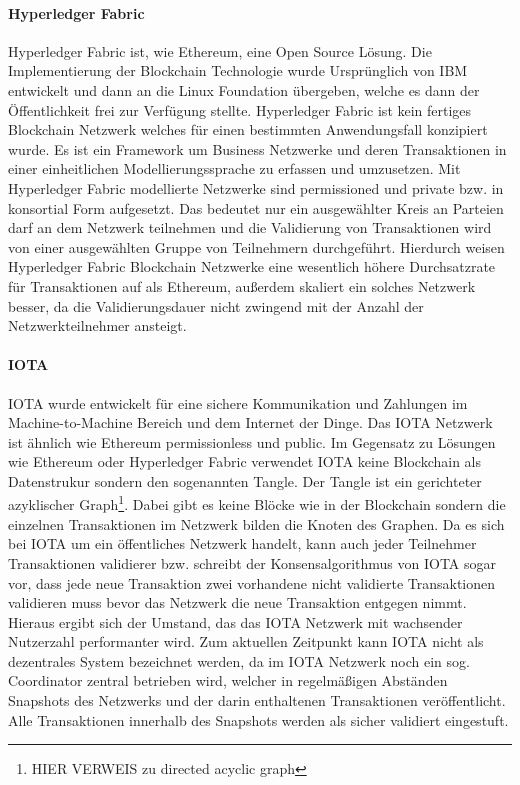 \paragraph{Hyperledger Fabric}
Hyperledger Fabric ist, wie Ethereum, eine Open Source Lö\-sung. Die Implementierung der Blockchain Technologie wurde Ursprünglich von IBM entwickelt und dann an die Linux Foundation übergeben, welche es dann der Öffentlichkeit frei zur Verfügung stellte. Hyperledger Fabric ist kein fertiges Blockchain Netzwerk welches für einen bestimmten Anwendungsfall konzipiert wurde. Es ist ein Framework um Business Netzwerke und deren Transaktionen in einer einheitlichen Modellierungssprache zu erfassen und umzusetzen. Mit Hyperledger Fabric modellierte Netzwerke sind permissioned und private bzw. in konsortial Form aufgesetzt. Das bedeutet nur ein ausgewählter Kreis an Parteien darf an dem Netzwerk teilnehmen und die Validierung von Transaktionen wird von einer ausgewählten Gruppe von Teilnehmern durchgeführt. Hierdurch weisen Hyperledger Fabric Blockchain Netzwerke eine wesentlich höhere Durchsatzrate für Transaktionen auf als Ethereum, außerdem skaliert ein solches Netzwerk besser, da die Validierungsdauer nicht zwingend mit der Anzahl der Netzwerkteilnehmer ansteigt.

\paragraph{IOTA}
IOTA wurde entwickelt für eine sichere Kommunikation und Zahlungen im Machine-to-Machine Bereich und dem Internet der Dinge. Das IOTA Netzwerk ist ähnlich wie Ethereum permissionless und public. Im Gegensatz zu Lösungen wie Ethereum oder Hyperledger Fabric verwendet IOTA keine Blockchain als Datenstrukur sondern den sogenannten \glqq Tangle\grqq{}. Der Tangle ist ein gerichteter azyklischer Graph\footnote{HIER VERWEIS zu directed acyclic graph}. Dabei gibt es keine Blöcke wie in der Blockchain sondern die einzelnen Transaktionen im Netzwerk bilden die Knoten des Graphen. Da es sich bei IOTA um ein öffentliches Netzwerk handelt, kann auch jeder Teilnehmer Transaktionen validierer bzw. schreibt der Konsensalgorithmus von IOTA sogar vor, dass jede neue Transaktion zwei vorhandene nicht validierte Transaktionen validieren muss bevor das Netzwerk die neue Transaktion entgegen nimmt. Hieraus ergibt sich der Umstand, das das IOTA Netzwerk mit wachsender Nutzerzahl performanter wird. Zum aktuellen Zeitpunkt kann IOTA nicht als dezentrales System bezeichnet werden, da im IOTA Netzwerk noch ein sog. Coordinator zentral betrieben wird, welcher in regelmäßigen Abständen Snapshots des Netzwerks und der darin enthaltenen Transaktionen veröffentlicht. Alle Transaktionen innerhalb des Snapshots werden als sicher validiert eingestuft.

